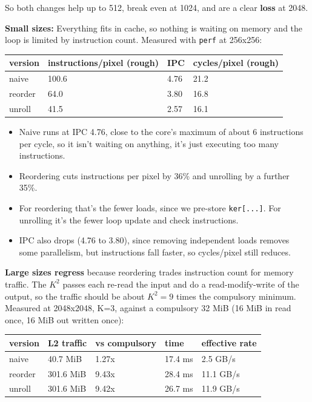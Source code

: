 \documentclass[
  10pt,
]{article}
\newcounter{none} %
\providecommand{\tightlist}{%
  \setlength{\itemsep}{0pt}\setlength{\parskip}{0pt}}
\begin{document}
So both changes help up to 512, break even at 1024, and are a clear
\textbf{loss} at 2048.

\textbf{Small sizes:} Everything fits in cache, so nothing is waiting on
memory and the loop is limited by instruction count. Measured with
\texttt{perf} at 256x256:

\begin{longtable}[]{@{}llll@{}}
\toprule\noalign{}
version & instructions/pixel (rough) & IPC & cycles/pixel (rough) \\
\midrule\noalign{}
\endhead
\bottomrule\noalign{}
\endlastfoot
naive & 100.6 & 4.76 & 21.2 \\
reorder & 64.0 & 3.80 & 16.8 \\
unroll & 41.5 & 2.57 & 16.1 \\
\end{longtable}

\begin{itemize}
\tightlist
\item
  Naive runs at IPC 4.76, close to the core's maximum of about 6
  instructions per cycle, so it isn't waiting on anything, it's just
  executing too many instructions.
\item
  Reordering cuts instructions per pixel by 36\% and unrolling by a
  further 35\%.
\item
  For reordering that's the fewer loads, since we pre-store
  \texttt{ker[...]}. For unrolling it's the fewer loop update and check
  instructions.
\item
  IPC also drops (4.76 to 3.80), since removing independent loads removes
  some parallelism, but instructions fall faster, so cycles/pixel still
  reduces.
\end{itemize}

\textbf{Large sizes regress} because reordering trades instruction count
for memory traffic. The $K^2$ passes each re-read the input and do a
read-modify-write of the output, so the traffic should be about
$K^2 = 9$ times the compulsory minimum. Measured at 2048x2048, K=3,
against a compulsory 32 MiB (16 MiB in read once, 16 MiB out written
once):

{\def\LTcaptype{none} %
\begin{longtable}[]{@{}lllll@{}}
\toprule\noalign{}
version & L2 traffic & vs compulsory & time & effective rate \\
\midrule\noalign{}
\endhead
\bottomrule\noalign{}
\endlastfoot
naive & 40.7 MiB & 1.27x & 17.4 ms & 2.5 GB/s \\
reorder & 301.6 MiB & 9.43x & 28.4 ms & 11.1 GB/s \\
unroll & 301.6 MiB & 9.42x & 26.7 ms & 11.9 GB/s \\
\end{longtable}
}
\end{document}
